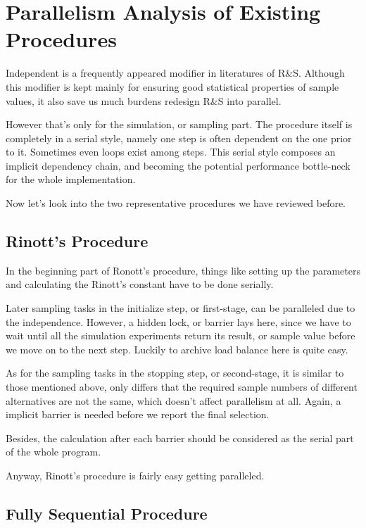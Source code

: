 \documentclass[12pt,a4paper]{report}
\begin{document}
\section{Parallelism Analysis of Existing Procedures}

Independent is a frequently appeared modifier in literatures of R\&S. Although this modifier is kept mainly for ensuring good statistical properties of sample values, it also save us much burdens redesign R\&S into parallel.

However that's only for the simulation, or sampling part. The procedure itself is completely in a serial style, namely one step is often dependent on the one prior to it. Sometimes even loops exist among steps. This serial style composes an implicit dependency chain, and becoming the potential performance bottle-neck for the whole implementation.

Now let's look into the two representative procedures we have reviewed before.

\subsection{Rinott's Procedure}

In the beginning part of Ronott's procedure, things like setting up the parameters and calculating the Rinott's constant have to be done serially.

Later sampling tasks in the initialize step, or first-stage, can be paralleled due to the independence. However, a hidden lock, or barrier lays here, since we have to wait until all the simulation experiments return its result, or sample value before we move on to the next step. Luckily to archive load balance here is quite easy.

As for the sampling tasks in the stopping step, or second-stage, it is similar to those mentioned above, only differs that the required sample numbers of different alternatives are not the same, which doesn't affect parallelism at all. Again, a implicit barrier is needed before we report the final selection.

Besides, the calculation after each barrier should be considered as the serial part of the whole program.

Anyway, Rinott's procedure is fairly easy getting paralleled.

\subsection{Fully Sequential Procedure}
\end{document}
